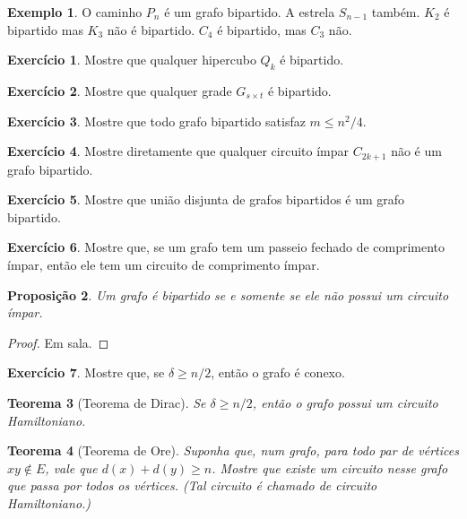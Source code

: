 \documentclass[12pt, a4paper]{article}
\newtheorem{teor}{Teorema}[section]
\newtheorem{prop}[teor]{Proposição}
\theoremstyle{definition}
\newtheorem{exem}[teor]{Exemplo}
\newtheorem{exer}{Exercício}
\begin{document}
\begin{exem}
O caminho $P_n$ é um grafo bipartido. A estrela $S_{n-1}$ também. $K_2$ é bipartido mas $K_3$ não é bipartido. $C_4$ é bipartido, mas $C_3$ não.
\end{exem}

\begin{exer}
  Mostre que qualquer hipercubo $Q_k$ é bipartido. 
\end{exer}

\begin{exer}
Mostre que qualquer grade $G_{s \times t}$ é bipartido.
\end{exer}

\begin{exer}
  Mostre que todo grafo bipartido satisfaz $m \leq n^2/4$.
\end{exer}

\begin{exer}
\label{exer:cimpar}
Mostre diretamente que qualquer circuito ímpar $C_{2k+1}$ não é um grafo bipartido.
\end{exer}

\begin{exer}
\label{exer:uni_bip}
Mostre que união disjunta de grafos bipartidos é um grafo bipartido.
\end{exer}

\begin{exer}
  Mostre que, se um grafo tem um passeio fechado de comprimento ímpar, então ele tem um circuito de comprimento ímpar.
\end{exer}

\begin{prop}
  Um grafo é bipartido se e somente se ele não possui um circuito ímpar. 
\end{prop}

\begin{proof}
  Em sala.
\end{proof}

\begin{exer}
  Mostre que, se $\delta \geq n/2$, então o grafo é conexo.
\end{exer}

\begin{teor}[Teorema de Dirac]
  Se $\delta \geq n/2$, então o grafo possui um circuito Hamiltoniano.
\end{teor}

\begin{teor}[Teorema de Ore]
  \label{teor:ore}
  Suponha que, num grafo, para todo par de vértices $xy \not\in E$,
  vale que $d(x) + d(y) \geq n$. Mostre que existe um circuito nesse
  grafo que passa por todos os vértices. (Tal circuito é chamado de circuito Hamiltoniano.)
\end{teor}
\end{document}
